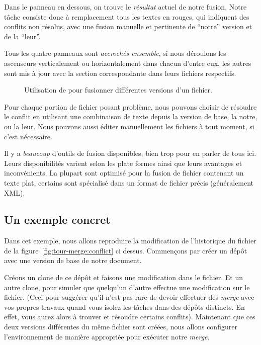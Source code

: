 Dans le panneau en dessous, on trouve le \emph{résultat} actuel de notre
fusion. Notre tâche consiste donc à remplacement tous les textes en rouges,
qui indiquent des conflits non résolus, avec une fusion manuelle et pertinente
de ``notre'' version et de la ``leur''. 

Tous les quatre panneaux sont \emph{accrochés ensemble}, si nous déroulons
les ascenseurs verticalement ou horizontalement dans chacun d'entre eux, les
autres sont mis à jour avec la section correspondante dans leurs fichiers
respectifs.

\begin{figure}[ht]
  \centering
  \caption{Utilisation de  pour fusionner différentes versions
  d'un fichier.}
  \label{fig:tour-merge:kdiff3}
\end{figure}

Pour chaque portion de fichier posant problème, nous pouvons choisir 
de résoudre le conflit en utilisant une combinaison 
de texte depuis la version de base, la notre, ou la leur. Nous pouvons 
aussi éditer manuellement les fichiers à tout moment, si c'est
nécessaire.

Il y a \emph{beaucoup} d'outils de fusion disponibles, bien trop pour
en parler de tous ici. Leurs disponibilités varient selon les plate formes
ainsi que leurs avantages et inconvénients. La plupart sont optimisé pour
la fusion de fichier contenant un texte plat, certains sont spécialisé
dans un format de fichier précis (généralement XML).

\subsection{Un exemple concret}

Dans cet exemple, nous allons reproduire la modification de l'historique
du fichier de la figure~\ref{fig:tour-merge:conflict} ci dessus. Commençons
par créer un dépôt avec une version de base de notre document.

Créons un clone de ce dépôt et faisons une modification dans le fichier.
Et un autre clone, pour simuler que quelqu'un d'autre effectue une
modification sur le fichier. (Ceci pour suggérer qu'il n'est pas rare
de devoir effectuer des \textit{merge} avec vos propres travaux quand 
vous isolez les tâches dans des dépôts distincts. En effet, vous 
aurez alors à trouver et résoudre certains conflits).
Maintenant que ces deux versions différentes du même fichier sont 
créées, nous allons configurer l'environnement de manière appropriée pour
exécuter notre \textit{merge}.

